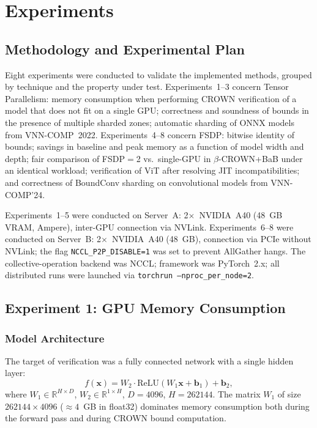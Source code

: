 \section{Experiments}

\subsection{Methodology and Experimental Plan}

Eight experiments were conducted to validate the implemented methods, grouped
by technique and the property under test. Experiments~1--3 concern Tensor
Parallelism: memory consumption when performing CROWN verification of a model
that does not fit on a single GPU; correctness and soundness of bounds in the
presence of multiple sharded zones; automatic sharding of ONNX models from
VNN-COMP~2022. Experiments~4--8 concern FSDP: bitwise identity of bounds;
savings in baseline and peak memory as a function of model width and depth;
fair comparison of FSDP$=$2 vs.\ single-GPU in $\beta$-CROWN+BaB under an
identical workload; verification of ViT after resolving JIT incompatibilities;
and correctness of BoundConv sharding on convolutional models from VNN-COMP'24.

Experiments~1--5 were conducted on Server~A: 2$\times$~NVIDIA~A40 (48~GB VRAM,
Ampere), inter-GPU connection via NVLink. Experiments~6--8 were conducted on
Server~B: 2$\times$~NVIDIA~A40 (48~GB), connection via PCIe without NVLink;
the flag \texttt{NCCL\_P2P\_DISABLE=1} was set to prevent AllGather hangs.
The collective-operation backend was NCCL; framework was PyTorch~2.x; all
distributed runs were launched via \texttt{torchrun --nproc\_per\_node=2}.

\subsection{Experiment 1: GPU Memory Consumption}

\subsubsection{Model Architecture}

The target of verification was a fully connected network with a single hidden
layer:
$$f(\mathbf{x}) = W_2 \cdot \mathrm{ReLU}(W_1 \mathbf{x} + \mathbf{b}_1) + \mathbf{b}_2,$$
where $W_1 \in \mathbb{R}^{H \times D}$, $W_2 \in \mathbb{R}^{1 \times H}$,
$D = 4096$, $H = 262144$. The matrix $W_1$ of size $262144 \times 4096$
($\approx\!4$~GB in float32) dominates memory consumption both during the
forward pass and during CROWN bound computation.

